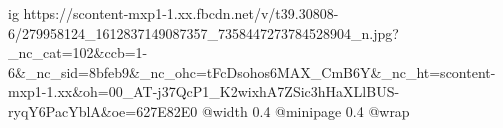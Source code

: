  
 
 
 
 

\ifcmt
  ig https://scontent-mxp1-1.xx.fbcdn.net/v/t39.30808-6/279958124_1612837149087357_7358447273784528904_n.jpg?_nc_cat=102&ccb=1-6&_nc_sid=8bfeb9&_nc_ohc=tFcDsohos6MAX_CmB6Y&_nc_ht=scontent-mxp1-1.xx&oh=00_AT-j37QcP1_K2wixhA7ZSic3hHaXLlBUS-ryqY6PacYblA&oe=627E82E0
  @width 0.4
  @minipage 0.4
  @wrap \parpic[r]
\fi
